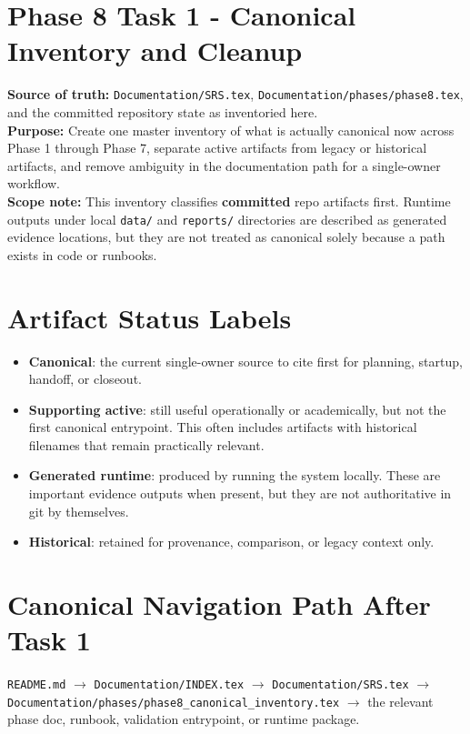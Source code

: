 \documentclass{article}
\begin{document}
\section*{Phase 8 Task 1 - Canonical Inventory and Cleanup}

\textbf{Source of truth:} \texttt{Documentation/SRS.tex}, \texttt{Documentation/phases/phase8.tex}, and the committed repository state as inventoried here.\\
\textbf{Purpose:} Create one master inventory of what is actually canonical now across Phase 1 through Phase 7, separate active artifacts from legacy or historical artifacts, and remove ambiguity in the documentation path for a single-owner workflow.\\
\textbf{Scope note:} This inventory classifies \textbf{committed} repo artifacts first. Runtime outputs under local \texttt{data/} and \texttt{reports/} directories are described as generated evidence locations, but they are not treated as canonical solely because a path exists in code or runbooks.

\section*{Artifact Status Labels}
\begin{itemize}
\item \textbf{Canonical}: the current single-owner source to cite first for planning, startup, handoff, or closeout.
\item \textbf{Supporting active}: still useful operationally or academically, but not the first canonical entrypoint. This often includes artifacts with historical filenames that remain practically relevant.
\item \textbf{Generated runtime}: produced by running the system locally. These are important evidence outputs when present, but they are not authoritative in git by themselves.
\item \textbf{Historical}: retained for provenance, comparison, or legacy context only.
\end{itemize}

\section*{Canonical Navigation Path After Task 1}
\texttt{README.md} $\rightarrow$ \texttt{Documentation/INDEX.tex} $\rightarrow$ \texttt{Documentation/SRS.tex} $\rightarrow$ \texttt{Documentation/phases/phase8\_canonical\_inventory.tex} $\rightarrow$ the relevant phase doc, runbook, validation entrypoint, or runtime package.
\end{document}
